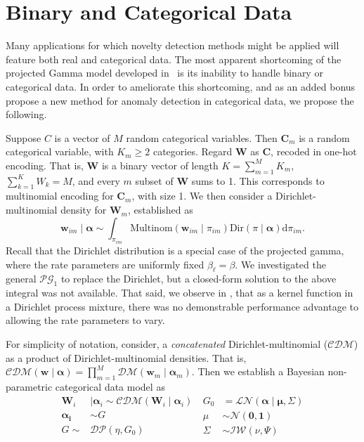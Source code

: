 \section{Binary and Categorical Data}
Many applications for which novelty detection methods might be applied will 
    feature both real and categorical data.   The most apparent 
    shortcoming of the projected Gamma model developed in~\cite{trubey:pg} is
    its inability to handle binary or categorical data.  In order to ameliorate this
    shortcoming, and as an added bonus propose a new method for anomaly detection in
    categorical data, we propose the following.

Suppose $C$ is a vector of $M$ random categorical variables.  Then $\bm{C}_{m}$ 
    is a random categorical variable, with $K_{m} \geq 2$ categories. Regard $\bm{W}$ 
    as $\bm{C}$, recoded in one-hot encoding.  That is, $\bm{W}$ is a binary vector of 
    length $K = \sum_{m = 1}^M K_{m}$, $\sum_{k = 1}^K W_k = M$, and every $m$ subset 
    of $\bm{W}$ sums to 1.  This corresponds to multinomial encoding for $\bm{C}_m$,
    with size 1. We then consider a Dirichlet-multinomial density for $\bm{W}_m$,
    established as
  \begin{equation*}
    \bm{w}_{im}\mid\bm{\alpha} 
    \sim 
    \int_{\pi_{im}} 
    \text{Multinom}(\bm{w}_{im}\mid\pi_{im})
    \text{Dir}(\pi\mid\bm{\alpha})\text{d}\pi_{im}.
  \end{equation*}
  Recall that the Dirichlet distribution is a special case of the projected gamma,
  where the rate parameters are uniformly fixed $\beta_{\ell} = \beta$.  We investigated
  the general $\mathcal{PG}_1$ to replace the Dirichlet, but a closed-form solution to 
  the above integral was not available.  That said, we observe in 
  \cite{trubey:pg}, that as a kernel function in a Dirichlet process mixture, there was
  no demonstrable performance advantage to allowing the rate parameters to vary.
 
  For simplicity of notation, consider, a \emph{concatenated} Dirichlet-multinomial 
  ($\mathcal{CDM}$) as a product of Dirichlet-multinomial densities.  That is, 
  $\mathcal{CDM}(\bm{w}\mid\bm{\alpha}) = \prod_{m = 1}^M\mathcal{DM}(\bm{w}_m\mid\bm{\alpha}_m)$.
  Then we establish a Bayesian non-parametric categorical data model as
  \begin{equation}
    \begin{aligned}
      \bm{W}_i &\mid \bm{\alpha}_i \sim \mathcal{CDM}\left(\bm{W}_i\mid\bm{\alpha}_i\right)\\
      \bm{\alpha_i} &\sim G\\
      G\sim &\mathcal{DP}\left(\eta, G_0\right)
    \end{aligned}
    ~
    \begin{aligned}
    G_0 &= \mathcal{LN}\left(\bm{\alpha}\mid\bm{\mu},\Sigma\right)\\
    \mu &\sim \mathcal{N}\left(\bm{0},\bm{1}\right)\\
    \Sigma &\sim \mathcal{IW}\left(\nu, \Psi\right)
    \end{aligned}
  \end{equation}
   
